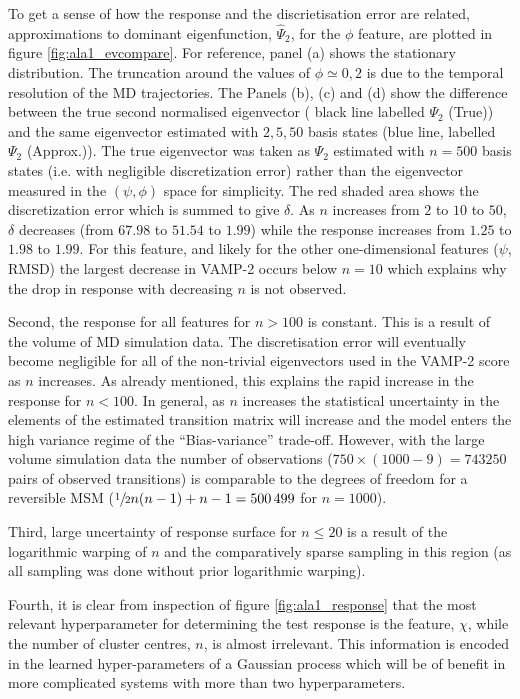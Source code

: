To get a sense of how the response and the discrietisation error are related, approximations to dominant eigenfunction, $\hat{\Psi}_{2}$, for the $\phi$ feature, are plotted in figure \ref{fig:ala1_evcompare}. For reference, panel (a) shows the stationary distribution. The truncation around the values of $\phi \simeq 0, 2$ is due to the temporal resolution of the MD trajectories. The Panels (b), (c) and (d) show the difference between the true second normalised eigenvector ( black line labelled $\Psi_{2}$ (True)) and the same eigenvector estimated with $2, 5, 50$ basis states (blue line, labelled $\Psi_{2}$ (Approx.)). The true eigenvector was taken as $\Psi_{2}$ estimated with $n=500$ basis states (i.e. with negligible discretization error) rather than the eigenvector measured in the $(\psi, \phi)$ space for simplicity. The red shaded area shows the discretization error which is summed to give $\delta$. As $n$ increases from $2$ to $10$ to $50$, $\delta$ decreases (from $67.98$ to $51.54$ to $1.99$) while the response increases from $1.25$ to $1.98$ to $1.99$. For this feature, and likely for the other one-dimensional features ($\psi$, RMSD) the largest decrease in VAMP-2 occurs below $n=10$ which explains why the drop in response with decreasing $n$ is not observed. 

Second, the response for all features for $n > 100$ is constant. This is a result of the volume of MD simulation data. The discretisation error will eventually become negligible for all of the  non-trivial eigenvectors used in the VAMP-2 score as $n$ increases. As already mentioned, this explains the rapid increase in the response for $n<100$. In general, as $n$ increases the statistical uncertainty in the elements of the estimated transition matrix will increase and the model enters the high variance regime of the ``Bias-variance'' trade-off.  However, with the large volume simulation data the number of observations ($750\times(1000-9) = \num{743250}$ pairs of observed transitions) is comparable to the degrees of freedom for a reversible MSM \cite{trendelkamp-schroerEstimationUncertaintyReversible2015b} ($\sfrac{1}{2}n(n-1)+n-1=\num{500499}$ for $n=1000$).   

Third, large uncertainty of response surface for $n \leq 20$ is a result of the logarithmic warping  of $n$ and the comparatively sparse sampling in this region (as all sampling was done without prior logarithmic warping). 

Fourth, it is clear from inspection of figure \ref{fig:ala1_response} that the most relevant hyperparameter for determining the test response is the feature, $\chi$, while the number of cluster centres,  $n$, is almost irrelevant. This information is encoded in the learned hyper-parameters of a Gaussian process which will be of benefit in more complicated systems with more than two hyperparameters. 
 
